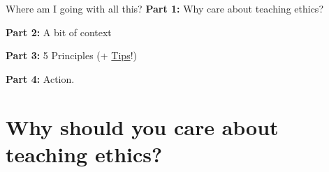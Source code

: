 



\maketitle

\begin{frame}{Where am I going with all this?}
\textbf{Part 1:} Why care about teaching ethics?

\vspace{2em}

\textbf{Part 2:} A bit of context 

\vspace{2em}

\textbf{Part 3:} 5 Principles (+ \underline{Tips}!)

\vspace{2em}

\textbf{Part 4:} Action.
\end{frame}

\section{Why should you care about teaching ethics?}

